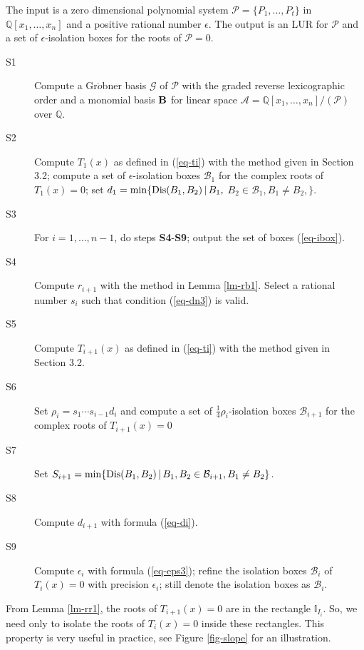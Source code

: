 \documentclass[amsthm]{JSC_LaTex_2007_Mar_12/elsart}
\def\bref#1{(\ref{#1})}
\def\Q{{\mathbb{Q}}}
\def\B{{\bf B}}
\def\PS{ {\mathcal{P}} }
\def\GB{{\mathcal{G}}}
\def\Dis{\hbox{\rm{Dis}}}
\begin{document}
\begin{alg} \label{alg-1}
The input is a zero dimensional polynomial system
$\PS=\{P_1,\dots,P_t\}$ in $\Q[x_1,\ldots,x_n]$ and a positive
rational number $\epsilon$. The output is an LUR for $\PS$ and a set
of $\epsilon$-isolation boxes for the roots of $\PS=0$.
\end{alg}

\begin{description}
\item[S1]
Compute a Gr$\ddot{o}$bner basis $\GB$ of $\PS$ with the graded
reverse lexicographic order and a monomial basis $\B$ for linear
space $\mathcal{A}=\Q[x_1,\ldots,x_n]/(\PS)$ over $\Q$.

\item[S2]
Compute $T_1(x)$ as defined in \bref{eq-ti} with the method given in
Section 3.2; compute a set of $\epsilon$-isolation boxes
$\mathcal{B}_1$ for the complex roots of $T_1(x)=0$; set $d_1 =
\min\{\Dis(B_1,B_2)\, |\, B_1,$ $B_2\in\mathcal{B}_1, B_1\ne B_2,
\}$.

\item[S3]
For $i=1,\ldots,n-1$, do steps  {\bf S4}-{\bf S9}; output the set of
boxes \bref{eq-ibox}.

\item[S4]
Compute $r_{i+1}$ with the method in Lemma
\ref{lm-rb1}. Select a rational number $s_i$ such that condition
\bref{eq-dn3} is valid.

\item[S5]
Compute $T_{i+1}(x)$ as defined in \bref{eq-ti} with the method
given in Section 3.2.

\item[S6]
Set $\rho_i=s_1\cdots s_{i-1}d_{i}$ and compute a set of
$\frac{1}{4}\rho_i$-isolation boxes $\mathcal{B}_{i+1}$ for the
complex roots of $T_{i+1}(x)=0$

\item[S7]
Set $S_{i+1} = \min\{\Dis(B_1,B_2)\,|\,B_1,B_2\in\mathcal{B}_{i+1},
B_1\ne B_2\}$.

\item[S8]
Compute $d_{i+1}$ with formula \bref{eq-di}.

\item[S9]
Compute $\epsilon_i$ with formula \bref{eq-eps3}; refine the
isolation boxes $\mathcal{B}_i$ of $T_i(x)=0$ with precision
$\epsilon_i$; still denote the isolation boxes as $\mathcal{B}_i$.

\end{description}

\begin{rem}
From Lemma \ref{lm-rr1}, the roots of $T_{i+1}(x)=0$ are in the
rectangle $\mathbb{I}_{I_i}$.
So, we need only to isolate the roots of $T_i(x)=0$ inside these
rectangles. This property is very useful in practice, see Figure
\ref{fig-slope} for an illustration.
\end{rem}
\end{document}
